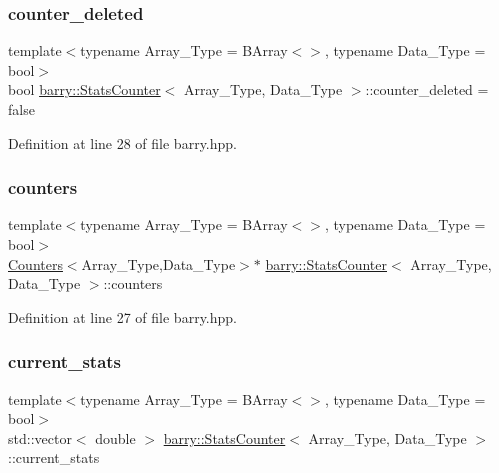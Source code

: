\subsubsection{\texorpdfstring{counter\+\_\+deleted}{counter\_deleted}}
{\footnotesize\ttfamily template$<$typename Array\+\_\+\+Type = B\+Array$<$$>$, typename Data\+\_\+\+Type = bool$>$ \\
bool \hyperlink{classbarry_1_1_stats_counter}{barry\+::\+Stats\+Counter}$<$ Array\+\_\+\+Type, Data\+\_\+\+Type $>$\+::counter\+\_\+deleted = false}



Definition at line 28 of file barry.\+hpp.

\mbox{\label{classbarry_1_1_stats_counter_a7100901cfe8f02c96b76b381fa06f94c}} 
\subsubsection{\texorpdfstring{counters}{counters}}
{\footnotesize\ttfamily template$<$typename Array\+\_\+\+Type = B\+Array$<$$>$, typename Data\+\_\+\+Type = bool$>$ \\
\hyperlink{classbarry_1_1_counters}{Counters}$<$Array\+\_\+\+Type,Data\+\_\+\+Type$>$$\ast$ \hyperlink{classbarry_1_1_stats_counter}{barry\+::\+Stats\+Counter}$<$ Array\+\_\+\+Type, Data\+\_\+\+Type $>$\+::counters}



Definition at line 27 of file barry.\+hpp.

\mbox{\label{classbarry_1_1_stats_counter_ad99718884cffbeca3cb98d574f6956a1}} 
\subsubsection{\texorpdfstring{current\+\_\+stats}{current\_stats}}
{\footnotesize\ttfamily template$<$typename Array\+\_\+\+Type = B\+Array$<$$>$, typename Data\+\_\+\+Type = bool$>$ \\
std\+::vector$<$ double $>$ \hyperlink{classbarry_1_1_stats_counter}{barry\+::\+Stats\+Counter}$<$ Array\+\_\+\+Type, Data\+\_\+\+Type $>$\+::current\+\_\+stats}



